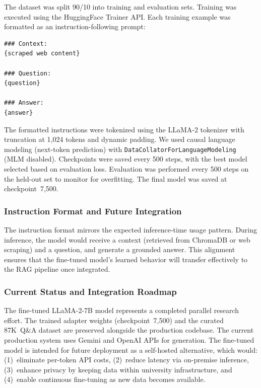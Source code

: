 \documentclass[conference,compsoc]{IEEEtran}
\begin{document}
The dataset was split 90/10 into training and evaluation sets. Training was executed using the HuggingFace Trainer API. Each training example was formatted as an instruction-following prompt:

\begin{lstlisting}[basicstyle=\ttfamily\scriptsize]
### Context:
{scraped web content}

### Question:
{question}

### Answer:
{answer}
\end{lstlisting}

\noindent The formatted instructions were tokenized using the LLaMA-2 tokenizer with truncation at 1,024 tokens and dynamic padding. We used causal language modeling (next-token prediction) with \texttt{DataCollatorForLanguageModeling} (MLM disabled). Checkpoints were saved every 500 steps, with the best model selected based on evaluation loss. Evaluation was performed every 500 steps on the held-out set to monitor for overfitting. The final model was saved at checkpoint~7,500.

\subsubsection{Instruction Format and Future Integration}

The instruction format mirrors the expected inference-time usage pattern. During inference, the model would receive a context (retrieved from ChromaDB or web scraping) and a question, and generate a grounded answer. This alignment ensures that the fine-tuned model's learned behavior will transfer effectively to the RAG pipeline once integrated.

\subsubsection{Current Status and Integration Roadmap}

The fine-tuned LLaMA-2-7B model represents a completed parallel research effort. The trained adapter weights (checkpoint~7,500) and the curated 87K~Q\&A dataset are preserved alongside the production codebase. The current production system uses Gemini and OpenAI APIs for generation. The fine-tuned model is intended for future deployment as a self-hosted alternative, which would: (1)~eliminate per-token API costs, (2)~reduce latency via on-premise inference, (3)~enhance privacy by keeping data within university infrastructure, and (4)~enable continuous fine-tuning as new data becomes available.
\end{document}
